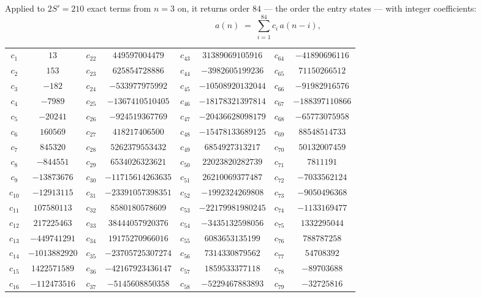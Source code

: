 \documentclass[11pt,a4paper]{article}
\theoremstyle{plain}
\theoremstyle{definition}
\begin{document}
Applied to $2S'=210$ exact terms from $n=3$ on, it returns order $84$ --- the
order the entry states --- with integer coefficients:
\[
a(n)\;=\;\sum_{i=1}^{84}c_i\,a(n-i),
\]
\begin{center}\small
\begin{tabular}{cccccccc}
$c_{1}$ & $13$ & $c_{22}$ & $449597004479$ & $c_{43}$ & $31389069105916$ & $c_{64}$ & $-41890696116$ \\
$c_{2}$ & $153$ & $c_{23}$ & $625854728886$ & $c_{44}$ & $-3982605199236$ & $c_{65}$ & $71150266512$ \\
$c_{3}$ & $-182$ & $c_{24}$ & $-533977975992$ & $c_{45}$ & $-10508920132044$ & $c_{66}$ & $-91982916576$ \\
$c_{4}$ & $-7989$ & $c_{25}$ & $-1367410510405$ & $c_{46}$ & $-18178321397814$ & $c_{67}$ & $-188397110866$ \\
$c_{5}$ & $-20241$ & $c_{26}$ & $-924519367769$ & $c_{47}$ & $-20436628098179$ & $c_{68}$ & $-65773075958$ \\
$c_{6}$ & $160569$ & $c_{27}$ & $418217406500$ & $c_{48}$ & $-15478133689125$ & $c_{69}$ & $88548514733$ \\
$c_{7}$ & $845320$ & $c_{28}$ & $5262379553432$ & $c_{49}$ & $6854927313217$ & $c_{70}$ & $50132007459$ \\
$c_{8}$ & $-844551$ & $c_{29}$ & $6534026323621$ & $c_{50}$ & $22023820282739$ & $c_{71}$ & $7811191$ \\
$c_{9}$ & $-13873676$ & $c_{30}$ & $-11715614263635$ & $c_{51}$ & $26210069377487$ & $c_{72}$ & $-7033562124$ \\
$c_{10}$ & $-12913115$ & $c_{31}$ & $-23391057398351$ & $c_{52}$ & $-1992324269808$ & $c_{73}$ & $-9050496368$ \\
$c_{11}$ & $107580113$ & $c_{32}$ & $8580180578609$ & $c_{53}$ & $-22179981980245$ & $c_{74}$ & $-1133169477$ \\
$c_{12}$ & $217225463$ & $c_{33}$ & $38444057920376$ & $c_{54}$ & $-3435132598056$ & $c_{75}$ & $1332295044$ \\
$c_{13}$ & $-449741291$ & $c_{34}$ & $19175270966016$ & $c_{55}$ & $6083653135199$ & $c_{76}$ & $788787258$ \\
$c_{14}$ & $-1013882920$ & $c_{35}$ & $-23705725307274$ & $c_{56}$ & $7314330879562$ & $c_{77}$ & $54708392$ \\
$c_{15}$ & $1422571589$ & $c_{36}$ & $-42167923436147$ & $c_{57}$ & $1859533377118$ & $c_{78}$ & $-89703688$ \\
$c_{16}$ & $-112473516$ & $c_{37}$ & $-5145608850358$ & $c_{58}$ & $-5229467883893$ & $c_{79}$ & $-32725816$ \\

\end{tabular}
\end{center}
\end{document}
